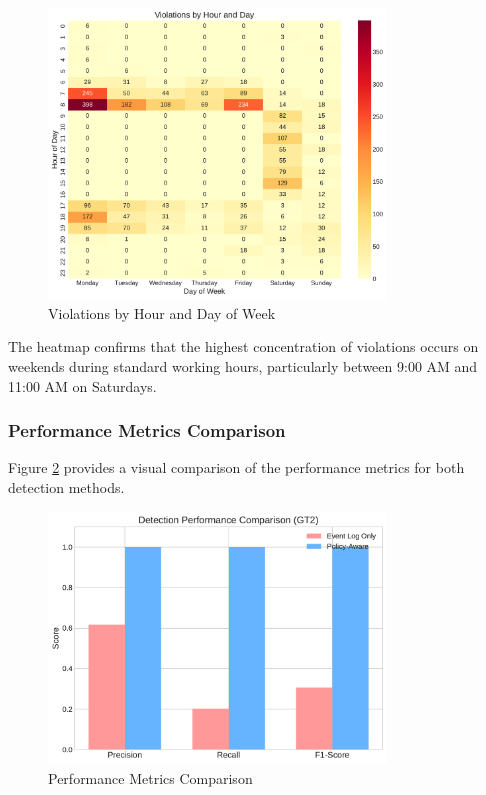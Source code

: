 \begin{figure}[h]
\centering
\includegraphics[width=0.8\textwidth]{figures/violations_hour_day_heatmap.pdf}
\caption{Violations by Hour and Day of Week}
\label{fig:hour-day-heatmap}
\end{figure}

The heatmap confirms that the highest concentration of violations occurs on weekends during standard working hours, particularly between 9:00 AM and 11:00 AM on Saturdays.

\subsubsection{Performance Metrics Comparison}

Figure \ref{fig:performance-metrics} provides a visual comparison of the performance metrics for both detection methods.

\begin{figure}[h]
\centering
\includegraphics[width=0.8\textwidth]{figures/performance_metrics_comparison.pdf}
\caption{Performance Metrics Comparison}
\label{fig:performance-metrics}
\end{figure}

